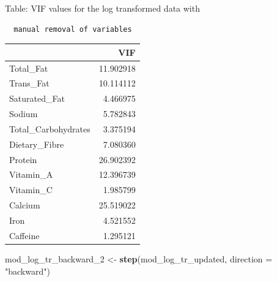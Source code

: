 \documentclass[
]{article}
\newenvironment{Shaded}{\begin{snugshade}}{\end{snugshade}}
\newcommand{\AttributeTok}[1]{\textcolor[rgb]{0.13,0.29,0.53}{#1}}
\newcommand{\FunctionTok}[1]{\textcolor[rgb]{0.13,0.29,0.53}{\textbf{#1}}}
\newcommand{\NormalTok}[1]{#1}
\newcommand{\OtherTok}[1]{\textcolor[rgb]{0.56,0.35,0.01}{#1}}
\newcommand{\StringTok}[1]{\textcolor[rgb]{0.31,0.60,0.02}{#1}}
\begin{document}
Table: VIF values for the log transformed data with

\begin{verbatim}
  manual removal of variables
\end{verbatim}

\begin{longtable}[]{@{}lr@{}}
\toprule\noalign{}
& VIF \\
\midrule\noalign{}
\endhead
\bottomrule\noalign{}
\endlastfoot
Total\_Fat & 11.902918 \\
Trans\_Fat & 10.114112 \\
Saturated\_Fat & 4.466975 \\
Sodium & 5.782843 \\
Total\_Carbohydrates & 3.375194 \\
Dietary\_Fibre & 7.080360 \\
Protein & 26.902392 \\
Vitamin\_A & 12.396739 \\
Vitamin\_C & 1.985799 \\
Calcium & 25.519022 \\
Iron & 4.521552 \\
Caffeine & 1.295121 \\
\end{longtable}

\begin{Shaded}
\begin{Highlighting}[]
\NormalTok{mod\_log\_tr\_backward\_2 }\OtherTok{\textless{}{-}} \FunctionTok{step}\NormalTok{(mod\_log\_tr\_updated, }\AttributeTok{direction =} \StringTok{"backward"}\NormalTok{)}
\end{Highlighting}
\end{Shaded}
\end{document}
